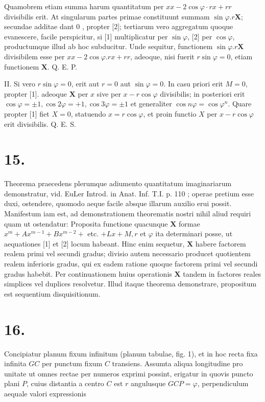 \documentclass[twoside,12pt, showframe]{memoir}
\begin{document}
Quamobrem etiam summa harum quantitatum per \(x x-2 \cos \varphi \cdot r x+r r\) divisibilis erit. At singularum partes primae constituunt summam \(\sin \varphi . r \mathbf{X}\); secundae additae dant 0 , propter [2]; tertiarum vero aggregatum quoque evanescere, facile perspicitur, si [1] multiplicatur per \(\sin \varphi\), [2] per \(\cos \varphi\), productumque illud ab hoc subducitur. Unde sequitur, functionem \(\sin \varphi . r \boldsymbol{X}\) divisibilem esse per \(x x-2 \cos \varphi . r x+r r\), adeoque, nisi fuerit \(r \sin \varphi=0\), etiam functionem \(\boldsymbol{X}\). Q. E. P.

II. Si vero \(r \sin \varphi=0\), erit aut \(r=0\) aut \(\sin \varphi=0\). In casu priori erit \(M=0\), propter [1]. adeoque \(\boldsymbol{X}\) per \(x\) sive per \(x-r \cos \varphi\) divisibilis; in posteriori erit \(\cos \varphi= \pm 1, \cos 2 \varphi=+1, \cos 3 \varphi= \pm 1\) et generaliter \(\cos n \varphi=\cos \varphi^{n}\). Quare propter [1] fiet \(X=0\), statuendo \(x=r \cos \varphi\), et proin functio \(X\) per \(x-r \cos \varphi\) erit divisibilis. Q. E. S.

\section*{15.}
Theorema praecedens plerumque adiumento quantitatum imaginariarum demonstratur, vid. EuLer Introd. in Anat. Inf. T.I. p. 110 ; operae pretium esse duxi, ostendere, quomodo aeque facile absque illarum auxilio erui possit. Manifestum iam est, ad demonstrationem theorematis nostri nihil aliud requiri quam ut ostendatur: Proposita functione quacunque \(\boldsymbol{X}\) formae \(x^{m}+A x^{m-1}+B x^{m-2}+\) etc. \(+L x+M, r\) et \(\varphi\) ita determinari posse, ut aequationes [1] et [2] locum habeant. Hinc enim sequetur, \(\boldsymbol{X}\) habere factorem realem primi vel secundi gradus; divisio autem necessario producet quotientem realem inferioris gradus, qui ex eadem ratione quoque factorem primi vel secundi gradus habebit. Per continuationem huius operationis \(\boldsymbol{X}\) tandem in factores reales simplices vel duplices resolvetur. Illud itaque theorema demonstrare, propositum est sequentium disquisitionum.

\section*{16.}
Concipiatur planum fixum infinitum (planum tabulae, fig. 1), et in hoc recta fixa infinita \(G C\) per punctum fixum \(C\) transiens. Assumta aliqua longitudine pro unitate ut omnes rectae per numeros exprimi possint, erigatur in quovis puncto plani \(P\), cuius distantia a centro \(C\) est \(r\) angulusque \(G C P=\varphi\), perpendiculum aequale valori expressionis
\end{document}
